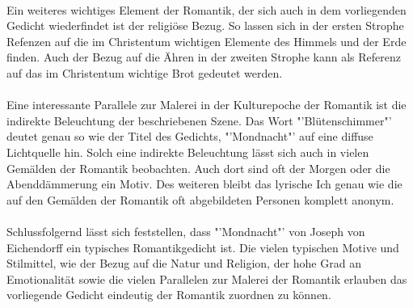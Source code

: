 \documentclass[11pt]{article}
\begin{document}
\paragraph{}
Ein weiteres wichtiges Element der Romantik, der sich auch in dem vorliegenden Gedicht wiederfindet ist der religiöse Bezug. So lassen sich in der ersten Strophe Refenzen auf die im Christentum wichtigen Elemente des Himmels und der Erde finden. Auch der Bezug auf die Ähren in der zweiten Strophe kann als Referenz auf das im Christentum wichtige Brot gedeutet werden.
\paragraph{}
Eine interessante Parallele zur Malerei in der Kulturepoche der Romantik ist die indirekte Beleuchtung der beschriebenen Szene. Das Wort "'Blütenschimmer"' deutet genau so wie der Titel des Gedichts, "'Mondnacht"' auf eine diffuse Lichtquelle hin. Solch eine indirekte Beleuchtung lässt sich auch in vielen Gemälden der Romantik beobachten. Auch dort sind oft der Morgen oder die Abenddämmerung ein Motiv. Des weiteren bleibt das lyrische Ich genau wie die auf den Gemälden der Romantik oft abgebildeten Personen komplett anonym.
\paragraph{}
Schlussfolgernd lässt sich feststellen, dass "'Mondnacht"' von Joseph von Eichendorff ein typisches Romantikgedicht ist. Die vielen typischen Motive und Stilmittel, wie der Bezug auf die Natur und Religion, der hohe Grad an Emotionalität sowie die vielen Parallelen zur Malerei der Romantik erlauben das vorliegende Gedicht eindeutig der Romantik zuordnen zu können.
\end{document}
